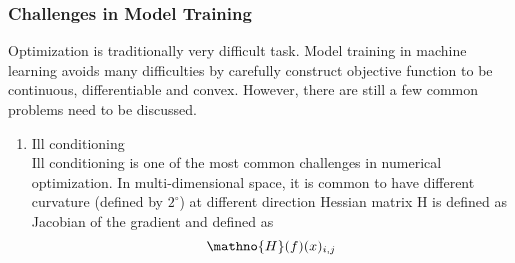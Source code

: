\subsubsection{Challenges in Model Training}

Optimization is traditionally very difficult task. Model training in machine learning avoids many difficulties by carefully construct objective function to be continuous, differentiable and convex. However, there are still a few common problems need to be discussed. 

\begin{enumerate}
    \item Ill conditioning\\
Ill conditioning is one of the most common challenges in numerical optimization. In multi-dimensional space, it is common to have different curvature (defined by $2^\circ$) at different direction
Hessian matrix $\mathrm{H}$ is defined as Jacobian of the gradient and defined as 
\begin{equation}
    \mathno{H}(f)(x)_{i,j}
\end{equation}
\end{enumerate}

